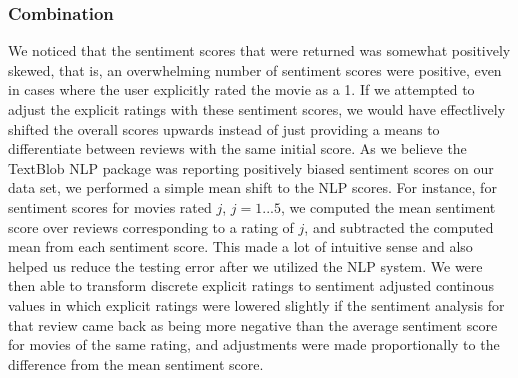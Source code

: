 \documentclass{article} %
\begin{document}
\subsubsection{Combination}We noticed that the sentiment scores that were returned was somewhat positively skewed, that is, an overwhelming number of sentiment scores were positive, even in cases where the user explicitly rated the movie as a 1. If we attempted to adjust the explicit ratings with these sentiment scores, we would have effectlively shifted the overall scores upwards instead of just providing a means to differentiate between reviews with the same initial score. As we believe the TextBlob NLP package was reporting positively biased sentiment scores on our data set, we performed a simple mean shift to the NLP scores. For instance, for sentiment scores for movies rated $j$, $j=1...5$, we computed the mean sentiment score over reviews corresponding to a rating of $j$, and subtracted the computed mean from each sentiment score. This made a lot of intuitive sense and also helped us reduce the testing error after we utilized the NLP system. We were then able to transform discrete explicit ratings to sentiment adjusted continous values in which explicit ratings were lowered slightly if the sentiment analysis for that review came back as being more negative than the average sentiment score for movies of the same rating, and adjustments were made proportionally to the difference from the mean sentiment score.
\end{document}
